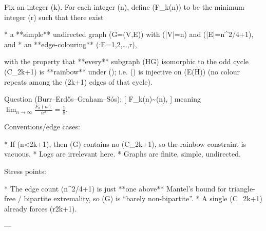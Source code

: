Fix an integer (k). For each integer (n), define (F_k(n)) to be the minimum integer (r) such that there exist

* a **simple** undirected graph (G=(V,E)) with (|V|=n) and (|E|=\lfloor n^2/4\rfloor+1), and
* an **edge-colouring** (\varphi:E\to [r]={1,2,\dots,r}),

with the property that **every** subgraph (H\subseteq G) isomorphic to the odd cycle (C_{2k+1}) is **rainbow** under (\varphi); i.e. (\varphi) is injective on (E(H)) (no colour repeats among the (2k+1) edges of that cycle).

Question (Burr–Erdős–Graham–Sós):
[
F_k(n)\sim {}\quad (n\to\infty),
]
meaning \(\displaystyle \lim_{n\to\infty}\frac{F_k(n)}{n^2}=\frac18\).

Conventions/edge cases:

* If (n<2k+1), then (G) contains no (C_{2k+1}), so the rainbow constraint is vacuous.
* Logs are irrelevant here.
* Graphs are finite, simple, undirected.

Stress points:

* The edge count (\lfloor n^2/4\rfloor+1) is just **one above** Mantel’s bound for triangle-free / bipartite extremality, so (G) is “barely non-bipartite”.
* A single (C_{2k+1}) already forces (r\ge 2k+1).

---
